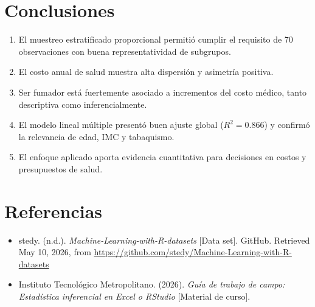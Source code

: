 \documentclass[12pt,a4paper]{article}
\begin{document}
\section{Conclusiones}
\begin{enumerate}
    \item El muestreo estratificado proporcional permitió cumplir el requisito de 70 observaciones con buena representatividad de subgrupos.
    \item El costo anual de salud muestra alta dispersión y asimetría positiva.
    \item Ser fumador está fuertemente asociado a incrementos del costo médico, tanto descriptiva como inferencialmente.
    \item El modelo lineal múltiple presentó buen ajuste global (\(R^2=0.866\)) y confirmó la relevancia de edad, IMC y tabaquismo.
    \item El enfoque aplicado aporta evidencia cuantitativa para decisiones en costos y presupuestos de salud.
\end{enumerate}

\section{Referencias}
\begin{itemize}
    \item stedy. (n.d.). \textit{Machine-Learning-with-R-datasets} [Data set]. GitHub. Retrieved May 10, 2026, from \url{https://github.com/stedy/Machine-Learning-with-R-datasets}
    \item Instituto Tecnológico Metropolitano. (2026). \textit{Guía de trabajo de campo: Estadística inferencial en Excel o RStudio} [Material de curso].
\end{itemize}
\end{document}
